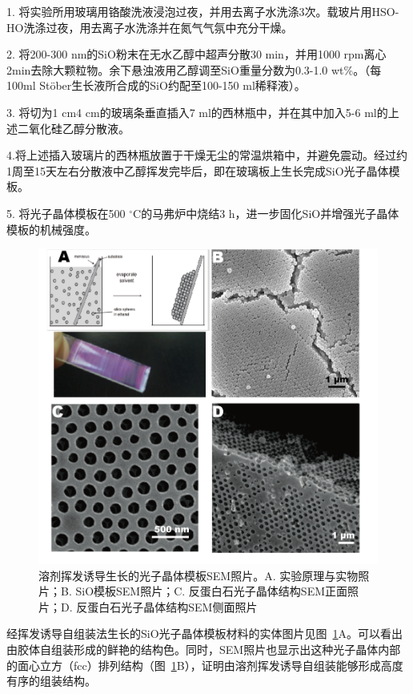 1. 将实验所用玻璃用铬酸洗液浸泡过夜，并用去离子水洗涤3次。载玻片用HSO-HO洗涤过夜，用去离子水洗涤并在氮气气氛中充分干燥。

2. 将200-300 nm的SiO粉末在无水乙醇中超声分散30 min，并用1000 rpm离心2min去除大颗粒物。余下悬浊液用乙醇调至SiO重量分数为0.3-1.0 wt\%。（每100ml Stöber生长液所合成的SiO约配至100-150 ml稀释液）。

3. 将切为1 cm\text{$\times$}4 cm的玻璃条垂直插入7 ml的西林瓶中，并在其中加入5-6 ml的上述二氧化硅乙醇分散液。

4.将上述插入玻璃片的西林瓶放置于干燥无尘的常温烘箱中，并避免震动。经过约1周至15天左右分散液中乙醇挥发完毕后，即在玻璃板上生长完成SiO光子晶体模板。

5. 将光子晶体模板在500 $^{\circ}$C的马弗炉中烧结3 h，进一步固化SiO并增强光子晶体模板的机械强度。

\begin{figure}[htbp]
  \centering
  \includegraphics[width=0.8\linewidth]{figures/ch2/opal-eval.png}
  \caption{溶剂挥发诱导生长的光子晶体模板SEM照片。A. 实验原理与实物照片；B. SiO模板SEM照片；C. 反蛋白石光子晶体结构SEM正面照片；D. 反蛋白石光子晶体结构SEM侧面照片}
  \label{fig:opal-SEM}
\end{figure}

经挥发诱导自组装法生长的SiO光子晶体模板材料的实体图片见图~\ref{fig:opal-SEM}A。可以看出由胶体自组装形成的鲜艳的结构色。同时，SEM照片也显示出这种光子晶体内部的面心立方（fcc）排列结构（图~\ref{fig:opal-SEM}B），证明由溶剂挥发诱导自组装能够形成高度有序的组装结构。

